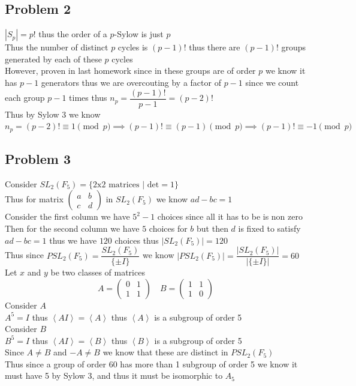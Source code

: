 \documentclass[12pt, letterpaper]{article}
\theoremstyle{definition}
\renewcommand{\t}[1]{\text{#1}}
\newcommand{\ang}[1]{\left\langle #1 \right\rangle}
\begin{document}
\newpage
\subsection*{Problem 2}
$|S_p|=p!$ thus the order of a $p$-Sylow is just $p$\\
Thus the number of distinct $p$ cycles is $(p-1)!$ thus there are $(p-1)!$ groups generated by each of these $p$ cycles\\
However, proven in last homework since in these groups are of order $p$ we know it has $p-1$ generators thus we are overcouting by a factor of $p-1$ since we count each group $p-1$ times thus $n_p=\dfrac{(p-1)!}{p-1}=(p-2)!$\\
Thus by Sylow 3 we know $n_p=(p-2)! \equiv 1 \pmod{p} \implies (p-1)! \equiv (p-1) \pmod{p} \implies (p-1)! \equiv -1 \pmod{p}$

\newpage
\subsection*{Problem 3}
Consider $SL_2(F_5) = \{\t{2x2 matrices } | \t{ det} = 1\}$\\
Thus for matrix $\begin{pmatrix}
    a & b\\
    c & d
\end{pmatrix}$ in $SL_2(F_5)$ we know $ad-bc=1$\\
Consider the first column we have $5^2-1$ choices since all it has to be is non zero\\
Then for the second column we have $5$ choices for $b$ but then $d$ is fixed to satisfy $ad-bc=1$ thus we have $120$ choices thus $|SL_2(F_5)|=120$\\
Thus since $PSL_2(F_5)=\dfrac{SL_2(F_5)}{\{\pm I\}}$ we know $|PSL_2(F_5)|=\dfrac{|SL_2(F_5)|}{|\{\pm I\}|}=60$\\
Let $x$ and $y$ be two classes of matrices
\[
A=\begin{pmatrix}
  0 & 1\\
  1 & 1  
\end{pmatrix} \quad
B=\begin{pmatrix}
    1 & 1\\
    1 & 0  
  \end{pmatrix}
\]
Consider $A$\\
$A^5=I$ thus $\ang{AI}=\ang{A}$ thus $\ang{A}$ is a subgroup of order 5\\
Consider $B$\\
$B^5=I$ thus $\ang{AI}=\ang{B}$ thus $\ang{B}$ is a subgroup of order 5\\
Since $A \neq B$ and $-A \neq B$ we know that these are distinct in $PSL_2(F_5)$\\
Thus since a group of order 60 has more than 1 subgroup of order 5 we know it must have 5 by Sylow 3, and thus it must be isomorphic to $A_5$
\end{document}

